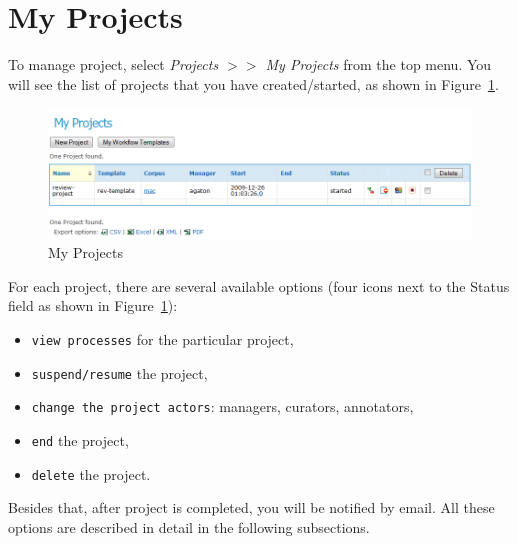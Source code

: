 \section{My Projects}
To manage project, select \emph{Projects $>>$ My Projects} from the top menu.
You will see the list of projects that you have created/started, as shown in
Figure~\ref{fig:myprojects}.
\begin{figure}[htb!]
\centering
\includegraphics[scale=0.4]{myprojects}
\caption{My Projects}
\label{fig:myprojects}
\end{figure}
For each project, there are several available options (four icons next to the
Status field as shown in Figure~\ref{fig:myprojects}):
\begin{itemize}
  \item \texttt{view processes} for the particular project,
  \item \texttt{suspend/resume} the project,
  \item \texttt{change the project actors}: managers, curators, annotators,
  \item \texttt{end} the project,
  \item \texttt{delete} the project.
\end{itemize}
Besides that, after project is completed, you will be notified by email.
All these options are described in detail in the following subsections.

